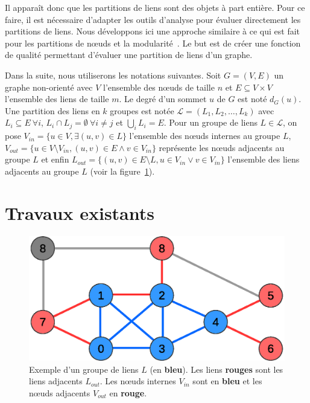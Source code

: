 Il apparaît donc que les partitions de liens sont des objets à part entière.
Pour ce faire, il est nécessaire d'adapter les outils d'analyse pour évaluer directement les partitions de liens.
Nous développons ici une approche similaire à ce qui est fait pour les partitions de n\oe{}uds et la modularité~\cite{Newman2004}.
Le but est de créer une fonction de qualité permettant d'évaluer une partition de liens d'un graphe.

Dans la suite, nous utiliserons les notations suivantes.
Soit $G=(V,E)$ un graphe non-orienté avec $V$ l'ensemble des n\oe{}uds de taille $n$ et $E \subseteq V \times V$ l'ensemble des liens de taille $m$. 
Le degré d'un sommet $u$ de $G$ est noté $d_G(u)$.
Une partition des liens en $k$ groupes est notée $\mathcal{L}=(L_1,L_2,\ldots,L_k)$ avec $L_i \subseteq E \ \forall i$, $L_i\cap L_j=\emptyset \ \forall i\neq j$ et $\bigcup_i L_i=E$.
Pour un groupe de liens $L \in \mathcal{L}$, on pose $V_{in}=\{u \in V, \exists (u,v) \in L\}$ l'ensemble des n\oe{}uds internes au groupe $L$, $V_{out}=\{u \in V\setminus V_{in}, (u,v) \in E \wedge v \in V_{in} \}$ représente les n\oe{}uds adjacents au groupe $L$ et enfin $L_{out}=\{(u,v) \in E \setminus L, u \in V_{in} \vee v \in V_{in} \}$ l'ensemble des liens adjacents au groupe $L$ (voir la figure~\ref{fig:example_def_expected}).

\section{Travaux existants}
\label{sec:expected_travaux}
\begin{figure}
\centering
\includegraphics[width=0.4\linewidth]{img/ExpectedNodes/exemple2}
\caption{Exemple d'un groupe de liens $L$ (en \textcolor{semilightblue}{\textbf{bleu}}). Les liens \textcolor{pinkyred}{\textbf{rouges}} sont les liens adjacents $L_{out}$.
Les n\oe{}uds internes $V_{in}$ sont en \textcolor{semilightblue}{\textbf{bleu}} et les n\oe{}uds adjacents $V_{out}$ en  \textcolor{pinkyred}{\textbf{rouge}}.}
\label{fig:example_def_expected}
\end{figure}

